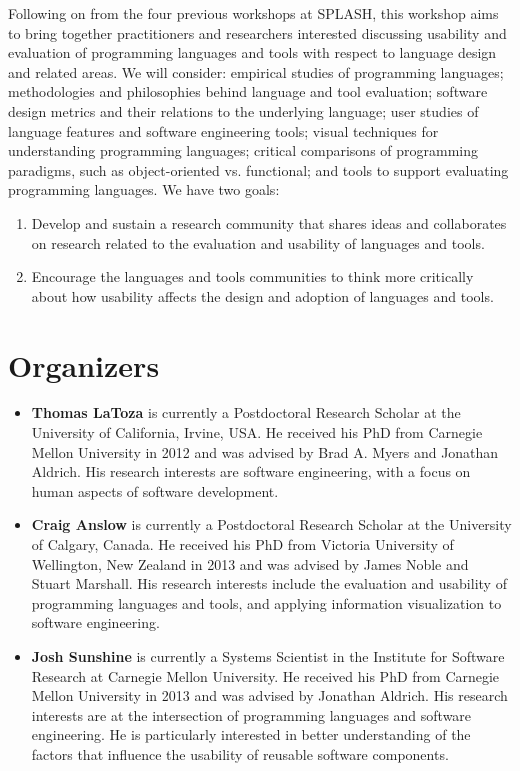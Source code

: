 \documentclass{sigplanconf}
\begin{document}
Following on from the four previous workshops at SPLASH, this workshop aims to bring together practitioners and
researchers interested discussing usability and evaluation of
programming languages and tools with respect to language design and
related areas. We will consider: empirical studies of programming
languages; methodologies and philosophies behind language and tool
evaluation; software design metrics and their relations to the
underlying language; user studies of language features and software
engineering tools; visual techniques for understanding programming
languages; critical comparisons of programming paradigms, such as
object-oriented vs. functional; and tools to support evaluating
programming languages. We have two goals:

\begin{enumerate}
  \item 
Develop and sustain a research community that shares ideas and collaborates on 
research related to the evaluation and usability of languages and tools.
\item
Encourage the languages and tools communities to think more critically
about how usability affects the  design and adoption of languages and tools.
\end{enumerate}


\section{Organizers}

\begin{itemize}
  
\item \textbf{Thomas LaToza} is currently a Postdoctoral Research Scholar at the University of California, Irvine, USA.  He received his PhD from Carnegie Mellon University in 2012 and was advised by Brad A. Myers and Jonathan Aldrich. His research interests are software engineering, with a focus on human aspects of software development. 

 \item \textbf{Craig Anslow} is currently a Postdoctoral Research Scholar at the University of Calgary, Canada. He received his PhD from Victoria University of Wellington, New Zealand in 2013 and was advised by James Noble and Stuart Marshall. His research interests include the evaluation and usability of programming languages and tools, and applying information visualization to software engineering.
  
\item \textbf{Josh Sunshine} is currently a Systems Scientist in the Institute for Software Research at Carnegie Mellon University.  He received his PhD from  Carnegie Mellon University in 2013 and was advised by Jonathan Aldrich. His research interests are at the intersection of programming languages and software engineering. He is particularly interested in better understanding of the factors that influence the usability of reusable software components.
  
\end{itemize}
\end{document}
